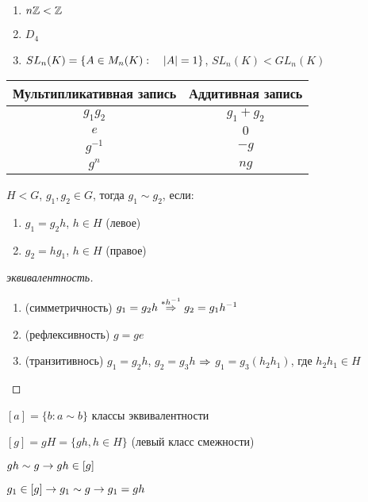 \documentclass[main]{subfiles}
\begin{document}
  \begin{examples}
      \begin{enumerate}
      	\item $n\mathbb{Z} < \mathbb{Z}$
      	\item $D_4$
      	\item $SL_n(K)=\{A \in M_n(K): \quad |A|=1\}$, $SL_n(K)<GL_n(K)$
  	\end{enumerate}
  \end{examples}

  \begin{tabular} {c|c}
  	Мультипликативная запись & Аддитивная запись\\ \hline
  	$g_1 g_2$ & $g_1 + g_2$\\
  	$e$ & $0$\\
  	$g^{-1}$ & $-g$\\
      $g^n$ & $ng$
  \end{tabular}

  \begin{definition}
      $H<G$, $g_1,g_2 \in G$, тогда $g_1 \sim g_2$, если:
      \begin{enumerate}
      	\item $g_1=g_2 h$, $h \in H$ (левое)
      	\item $g_2=h g_1$, $h \in H$ (правое)
  	\end{enumerate}
  \end{definition}

  \begin{proof}[эквивалентность]
      \begin{enumerate}
      	\item (симметричность) $g_1=g_2 h \overset{*h^{-1}}{\Rightarrow} g_2 = g_1 h^{-1}$
      	\item (рефлексивность) $g=ge$
      	\item (транзитивнось) $g_1=g_2 h$, $g_2 = g_3 h$ $\Rightarrow$ $g_1=g_3(h_2 h_1)$, где $h_2 h_1 \in H$
  	\end{enumerate}
  \end{proof}

  \begin{definition}
      $[a] = \{b:a∼b\}$ классы эквивалентности
  \end{definition}

  \begin{definition}
      $[g] = g H = \{g h, h \in H \}$ (левый класс смежности)

      $g h \sim g \rightarrow g h \in [g]$

      $g_1 \in [g] \rightarrow g_1 \sim g \rightarrow g_1 = g h$
  \end{definition}
\end{document}
